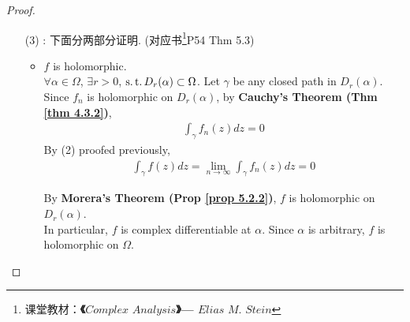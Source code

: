 \begin{thm}
\begin{proof}
\begin{enumerate}
			\vspace{2em}
			\item[(3)]: 下面分两部分证明. (对应书\footnote{课堂教材：\textbf{《$Complex \,\, Analysis$》---  $Elias \,\, M. \,\, Stein$}}P54 Thm 5.3)
			\begin{itemize}
				\item $f$ is holomorphic. \\
				$\forall \alpha \in \Omega$, $\exists r > 0$, $\operatorname{s.t.} D_{r}(\alpha) \subset \Omega$. Let $\gamma$ be any closed path in $D_{r}(\alpha)$.\\
				Since $f_n$ is holomorphic on $D_{r}(\alpha)$, by \textbf{Cauchy's Theorem (Thm \ref{thm 4.3.2})}, 
				\begin{align}
					\int_{\gamma}{f_{n}(z) dz} = 0
				\end{align}
				By (2) proofed previously, 
				\begin{align}
					\int_{\gamma}{f(z) dz} = \lim_{n \to \infty}{\int_{\gamma}{f_{n}(z) dz}} = 0
				\end{align}
				
				\newpage
				By \textbf{Morera's Theorem (Prop \ref{prop 5.2.2})}, $f$ is holomorphic on $D_{r}(\alpha)$.\\
				In particular, $f$ is complex differentiable at $\alpha$. Since $\alpha$ is arbitrary, $f$ is holomorphic on $\Omega$.
				
				\vspace{2em}
				

\end{itemize}
\end{enumerate}
\end{proof}
\end{thm}

